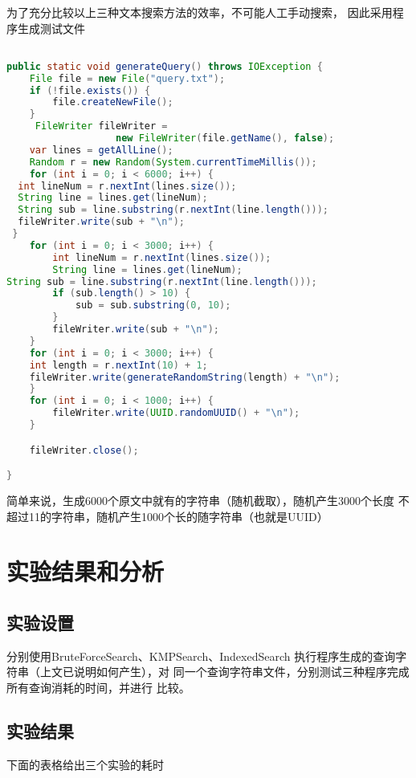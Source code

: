 \documentclass[12pt,a4paper]{ctexart}
\begin{document}
为了充分比较以上三种文本搜索方法的效率，不可能人工手动搜索，
因此采用程序生成测试文件
\begin{lstlisting}[basicstyle=\ttfamily,language=java,showstringspaces=false]

public static void generateQuery() throws IOException {
    File file = new File("query.txt");
    if (!file.exists()) {
        file.createNewFile();
    }
     FileWriter fileWriter = 
                   new FileWriter(file.getName(), false);
    var lines = getAllLine();
    Random r = new Random(System.currentTimeMillis());
    for (int i = 0; i < 6000; i++) {
  int lineNum = r.nextInt(lines.size());
  String line = lines.get(lineNum);
  String sub = line.substring(r.nextInt(line.length()));
  fileWriter.write(sub + "\n");
 }
    for (int i = 0; i < 3000; i++) {
        int lineNum = r.nextInt(lines.size());
        String line = lines.get(lineNum);
String sub = line.substring(r.nextInt(line.length()));
        if (sub.length() > 10) {
            sub = sub.substring(0, 10);
        }
        fileWriter.write(sub + "\n");
    }
    for (int i = 0; i < 3000; i++) {
    int length = r.nextInt(10) + 1;
    fileWriter.write(generateRandomString(length) + "\n");
    }
    for (int i = 0; i < 1000; i++) {
        fileWriter.write(UUID.randomUUID() + "\n");
    }

    fileWriter.close();

}
\end{lstlisting}

简单来说，生成6000个原文中就有的字符串（随机截取），随机产生3000个长度
不超过11的字符串，随机产生1000个长的随字符串（也就是UUID）




\section{实验结果和分析}

\subsection{实验设置}
分别使用BruteForceSearch、KMPSearch、IndexedSearch
执行程序生成的查询字符串（上文已说明如何产生），对
同一个查询字符串文件，分别测试三种程序完成所有查询消耗的时间，并进行
比较。

\subsection{实验结果}

下面的表格给出三个实验的耗时
\end{document}
